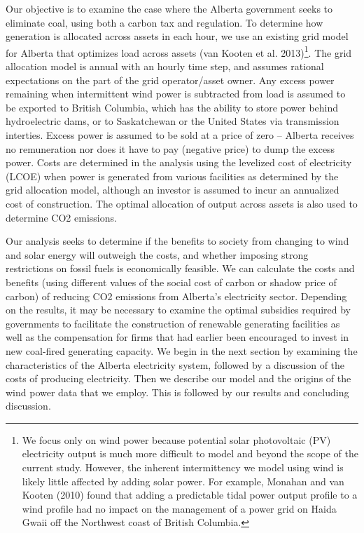Our objective is to examine the case where the Alberta government seeks to eliminate coal, using both a carbon tax and regulation. To determine how generation is allocated across assets in each hour, we use an existing grid model for Alberta that optimizes load across assets (van Kooten et al. 2013)\footnote{We focus only on wind power because potential solar photovoltaic (PV) electricity output is much more difficult to model and beyond the scope of the current study. However, the inherent intermittency we model using wind is likely little affected by adding solar power. For example, Monahan and van Kooten (2010) found that adding a predictable tidal power output profile to a wind profile had no impact on the management of a power grid on Haida Gwaii off the Northwest coast of British Columbia.}. The grid allocation model is annual with an hourly time step, and assumes rational expectations on the part of the grid operator/asset owner. Any excess power remaining when intermittent wind power is subtracted from load is assumed to be exported to British Columbia, which has the ability to store power behind hydroelectric dams, or to Saskatchewan or the United States via transmission interties. Excess power is assumed to be sold at a price of zero – Alberta receives no remuneration nor does it have to pay (negative price) to dump the excess power. Costs are determined in the analysis using the levelized cost of electricity (LCOE) when power is generated from various facilities as determined by the grid allocation model, although an investor is assumed to incur an annualized cost of construction. The optimal allocation of output across assets is also used to determine CO2 emissions. 


Our analysis seeks to determine if the benefits to society from changing to wind and solar energy will outweigh the costs, and whether imposing strong restrictions on fossil fuels is economically feasible. We can calculate the costs and benefits (using different values of the social cost of carbon or shadow price of carbon) of reducing CO2 emissions from Alberta’s electricity sector. Depending on the results, it may be necessary to examine the optimal subsidies required by governments to facilitate the construction of renewable generating facilities as well as the compensation for firms that had earlier been encouraged to invest in new coal-fired generating capacity. 
We begin in the next section by examining the characteristics of the Alberta electricity system, followed by a discussion of the costs of producing electricity. Then we describe our model and the origins of the wind power data that we employ. This is followed by our results and concluding discussion.


